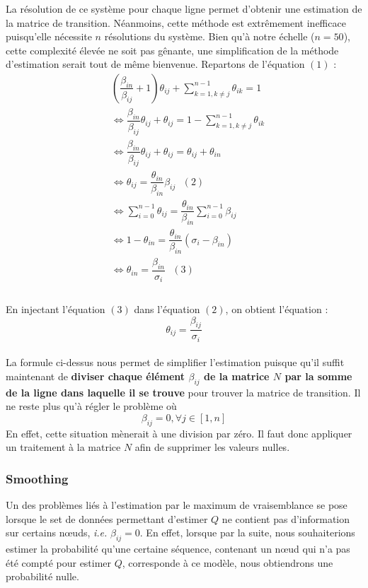 \documentclass[a4paper,titlepage]{report}
\begin{document}
La résolution de ce système pour chaque ligne permet d'obtenir une estimation de la matrice de transition. Néanmoins, cette méthode est extrêmement inefficace puisqu'elle nécessite $n$ résolutions du système. Bien qu'à notre échelle ($n = 50$), cette complexité élevée ne soit pas gênante, une simplification de la méthode d'estimation serait tout de même bienvenue. Repartons de l'équation $(1)$ : 
\[
\begin{aligned}
	&\left(\dfrac{\beta_{in}}{\beta_{ij}} + 1\right) \theta_{ij} + \sum\limits_{k = 1, k \neq j}^{n - 1} \theta_{ik} = 1\\
	&\Leftrightarrow \dfrac{\beta_{in}}{\beta_{ij}} \theta_{ij} + \theta_{ij} = 1 - \sum\limits_{k = 1, k \neq j}^{n - 1} \theta_{ik}\\
	&\Leftrightarrow \dfrac{\beta_{in}}{\beta_{ij}} \theta_{ij} + \theta_{ij} = \theta_{ij} + \theta_{in}\\
	&\Leftrightarrow \theta_{ij}= \dfrac{\theta_{in}}{\beta_{in}} \beta_{ij}\text{ }(2)\\
	&\Leftrightarrow \sum\limits_{i = 0}^{n - 1} \theta_{ij} = \dfrac{\theta_{in}}{\beta_{in}} \sum\limits_{i = 0}^{n - 1}\beta_{ij}\\
	&\Leftrightarrow 1 - \theta_{in} = \dfrac{\theta_{in}}{\beta_{in}} \left(\sigma_i - \beta_{in}\right)\\	
	&\Leftrightarrow \theta_{in} = \dfrac{\beta_{in}}{\sigma_{i}} \text{ }(3)\\	
\end{aligned}
\]
\paragraph{}
En injectant l'équation $(3)$ dans l'équation $(2)$, on obtient l'équation :
\[
\theta_{ij} = \dfrac{\beta_{ij}}{\sigma_{i}}
\]
\paragraph{}
La formule ci-dessus nous permet de simplifier l'estimation puisque qu'il suffit maintenant de \textbf{diviser chaque élément $\beta_{ij}
$ de la matrice $N$ par la somme de la ligne dans laquelle il se trouve} pour trouver la matrice de transition. Il ne reste plus qu'à régler le problème où
\[
\beta_{ij} = 0, \forall j \in [1,n]
\]
En effet, cette situation mènerait à une division par zéro. Il faut donc appliquer un traitement à la matrice $N$ afin de supprimer les valeurs nulles.
\subsubsection{Smoothing}
Un des problèmes liés à l'estimation par le maximum de vraisemblance se pose lorsque le set de données permettant d'estimer $Q$ ne contient pas d'information sur certains nœuds, \textit{i.e.} $\beta_{ij} = 0$. En effet, lorsque par la suite, nous souhaiterions estimer la probabilité qu'une certaine séquence, contenant un nœud qui n'a pas été compté pour estimer $Q$, corresponde à ce modèle, nous obtiendrons une probabilité nulle.
\end{document}
